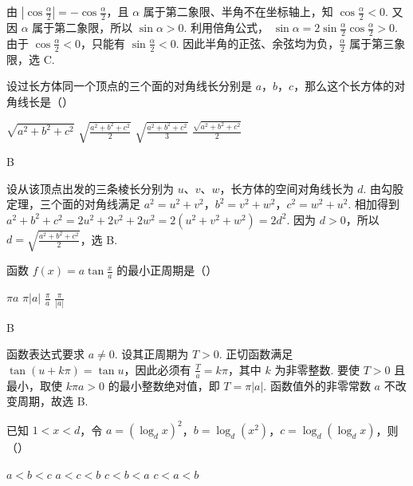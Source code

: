 \documentclass[UTF8,a4paper,oneside,11pt]{ctexbook}
\begin{document}
\begin{solution}
由 \(\left|\cos\frac\alpha2\right|=-\cos\frac\alpha2\)，且 \(\alpha\) 属于第二象限、半角不在坐标轴上，知 \(\cos\frac\alpha2<0\). 又因 \(\alpha\) 属于第二象限，所以 \(\sin\alpha>0\). 利用倍角公式，
\(\sin\alpha=2\sin\frac\alpha2\cos\frac\alpha2>0\). 由于 \(\cos\frac\alpha2<0\)，只能有 \(\sin\frac\alpha2<0\). 因此半角的正弦、余弦均为负，\(\frac\alpha2\) 属于第三象限，选 C.
\end{solution}

\begin{problem}
设过长方体同一个顶点的三个面的对角线长分别是 \(a\)，\(b\)，\(c\)，那么这个长方体的对角线长是（\quad）

\choices
    {\(\sqrt{a^2+b^2+c^2}\)}
    {\(\sqrt{\frac{a^2+b^2+c^2}{2}}\)}
    {\(\sqrt{\frac{a^2+b^2+c^2}{3}}\)}
    {\(\frac{\sqrt{a^2+b^2+c^2}}{2}\)}
\end{problem}

\begin{answer}
B
\end{answer}

\begin{solution}
设从该顶点出发的三条棱长分别为 \(u\)、\(v\)、\(w\)，长方体的空间对角线长为 \(d\). 由勾股定理，三个面的对角线满足
\(a^2=u^2+v^2\)，\(b^2=v^2+w^2\)，\(c^2=w^2+u^2\). 相加得到
\(a^2+b^2+c^2=2u^2+2v^2+2w^2=2\left(u^2+v^2+w^2\right)=2d^2\). 因为 \(d>0\)，所以 \(d=\sqrt{\frac{a^2+b^2+c^2}{2}}\)，选 B.
\end{solution}

\begin{problem}
函数 \(f(x)=a\tan\frac{x}{a}\) 的最小正周期是（\quad）

\choices
    {\(\pi a\)}
    {\(\pi|a|\)}
    {\(\frac{\pi}{a}\)}
    {\(\frac{\pi}{|a|}\)}
\end{problem}

\begin{answer}
B
\end{answer}

\begin{solution}
函数表达式要求 \(a\ne0\). 设其正周期为 \(T>0\). 正切函数满足 \(\tan(u+k\pi)=\tan u\)，因此必须有 \(\frac{T}{a}=k\pi\)，其中 \(k\) 为非零整数. 要使 \(T>0\) 且最小，取使 \(k\pi a>0\) 的最小整数绝对值，即 \(T=\pi|a|\). 函数值外的非零常数 \(a\) 不改变周期，故选 B.
\end{solution}

\begin{problem}
已知 \(1<x<d\)，令 \(a=\left(\log_d x\right)^2\)，\(b=\log_d\left(x^2\right)\)，\(c=\log_d\left(\log_d x\right)\)，则（\quad）

\choices
    {\(a<b<c\)}
    {\(a<c<b\)}
    {\(c<b<a\)}
    {\(c<a<b\)}
\end{problem}
\end{document}
